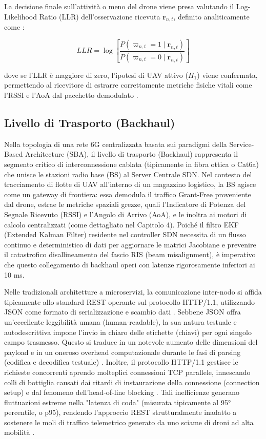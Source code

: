 \documentclass[twoside]{article}
\begin{document}
La decisione finale sull'attività o meno del drone viene presa valutando il Log-Likelihood Ratio (LLR) dell'osservazione ricevuta $\mathbf{r}_{n,t}$, definito analiticamente come \cite{Yu2024}:

\begin{equation}
LLR = \log \left[ \frac{P(\varpi_{n,t} = 1 \mid \mathbf{r}_{n,t})}{P(\varpi_{n,t} = 0 \mid \mathbf{r}_{n,t})} \right]
\label{eq:llr_decision}
\end{equation}

dove se l'LLR è maggiore di zero, l'ipotesi di UAV attivo ($H_1$) viene confermata, permettendo al ricevitore di estrarre correttamente metriche fisiche vitali come l'RSSI e l'AoA dal pacchetto demodulato \cite{Yu2024}.
\subsection{Livello di Trasporto (Backhaul)}

Nella topologia di una rete 6G centralizzata basata sui paradigmi della Service-Based Architecture (SBA), il livello di trasporto (Backhaul) rappresenta il segmento critico di interconnessione cablata (tipicamente in fibra ottica o Cat6a) che unisce le stazioni radio base (BS) al Server Centrale SDN. Nel contesto del tracciamento di flotte di UAV all'interno di un magazzino logistico, la BS agisce come un gateway di frontiera: essa demodula il traffico Grant-Free proveniente dal drone, estrae le metriche spaziali grezze, quali l'Indicatore di Potenza del Segnale Ricevuto (RSSI) e l'Angolo di Arrivo (AoA), e le inoltra ai motori di calcolo centralizzati (come dettagliato nel Capitolo 4). Poiché il filtro EKF (Extended Kalman Filter) residente nel controller SDN necessita di un flusso continuo e deterministico di dati per aggiornare le matrici Jacobiane e prevenire il catastrofico disallineamento del fascio RIS (beam misalignment), è imperativo che questo collegamento di backhaul operi con latenze rigorosamente inferiori ai 10 ms.

Nelle tradizionali architetture a microservizi, la comunicazione inter-nodo si affida tipicamente allo standard REST operante sul protocollo HTTP/1.1, utilizzando JSON come formato di serializzazione e scambio dati \cite{Vairam2023}. Sebbene JSON offra un'eccellente leggibilità umana (human-readable), la sua natura testuale e autodescrittiva impone l'invio in chiaro delle etichette (chiavi) per ogni singolo campo trasmesso. Questo si traduce in un notevole aumento delle dimensioni del payload e in un oneroso overhead computazionale durante le fasi di parsing (codifica e decodifica testuale) \cite{Vairam2023}. Inoltre, il protocollo HTTP/1.1 gestisce le richieste concorrenti aprendo molteplici connessioni TCP parallele, innescando colli di bottiglia causati dai ritardi di instaurazione della connessione (connection setup) e dal fenomeno dell'head-of-line blocking \cite{Vairam2023}. Tali inefficienze generano fluttuazioni estreme nella "latenza di coda" (misurata tipicamente al 95° percentile, o p95), rendendo l'approccio REST strutturalmente inadatto a sostenere le moli di traffico telemetrico generato da uno sciame di droni ad alta mobilità \cite{Vairam2023}.
\end{document}
